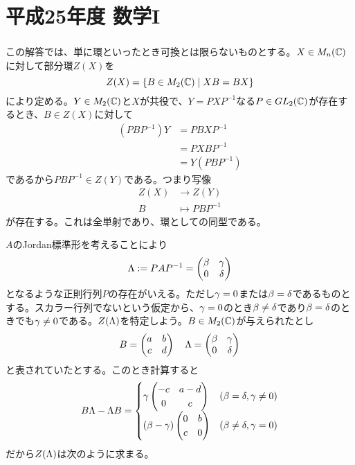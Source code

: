 \section{平成25年度 数学I}

\subsubsection{}%
\begin{sol}
この解答では、単に環といったとき可換とは限らないものとする。$X \in M_n({\mathbb C})$に対して部分環$Z(X)$を
\[
Z(X) = \left\{  B \in M_2({\mathbb C})  \mathrel{} \middle| \mathrel{}  XB = BX  \right\}
\]
により定める。$Y \in M_2({\mathbb C})$と$X$が共役で、$Y = PXP^{-1}$なる$P \in GL_2({\mathbb C})$が存在するとき、$B \in Z(X)$に対して
\begin{align*}
  (PBP^{-1}) Y &= PBXP^{-1} \\
  &= PXBP^{-1} \\
  &= Y (PBP^{-1})
\end{align*}
であるから$PBP^{-1} \in Z(Y)$である。つまり写像
\begin{align*}
  Z(X) &\to Z(Y) \\
  B &\mapsto PBP^{-1}
\end{align*}
が存在する。これは全単射であり、環としての同型である。

  $A$のJordan標準形を考えることにより
  \[
  {\Lambda} := PAP^{-1} = \begin{pmatrix}  \beta & {\gamma} \\ 0 & {\delta} \end{pmatrix}
  \]
  となるような正則行列$P$の存在がいえる。ただし${\gamma}=0$または$\beta = {\delta}$であるものとする。スカラー行列でないという仮定から、${\gamma}=0$のとき$\beta \neq {\delta}$であり$\beta = {\delta}$のときでも${\gamma} \neq 0$である。$Z({\Lambda})$を特定しよう。$B \in M_2({\mathbb C})$が与えられたとし
  \[
  B = \begin{pmatrix} a& b \\ c &d   \end{pmatrix} \quad {\Lambda} = \begin{pmatrix}  \beta & {\gamma} \\ 0 & {\delta} \end{pmatrix}
  \]
  と表されていたとする。このとき計算すると
  \begin{align*}
    B {\Lambda} - {\Lambda} B = \begin{cases}
    {\gamma} \begin{pmatrix} -c & a-d \\ 0 & c \end{pmatrix} &(\beta={\delta}, {\gamma} \neq 0) \\
    (\beta - {\gamma}) \begin{pmatrix} 0 & b \\ c & 0 \end{pmatrix} &(\beta \neq {\delta}, {\gamma} =0)
  \end{cases}
  \end{align*}
  だから$Z({\Lambda})$は次のように求まる。


\end{sol}
